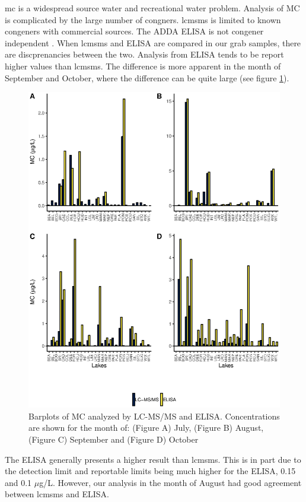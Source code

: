 \gls{mc} is a widespread source water and recreational water problem. Analysis of MC is complicated by the large number of congners. \gls{lcmsms} is limited to known congeners with commercial sources. The ADDA ELISA is not congener independent \cite{he_varied_2017}. When \gls{lcmsms} and ELISA are compared in our grab samples, there are discprenancies between the two. Analysis from ELISA tends to be report higher values than \gls{lcmsms}. The difference is more apparent in the month of September and October, where the difference can be quite large (see figure \ref{fig:compare}). 
\begin{figure}[p]
	\includegraphics[width=\textwidth]{figures/compare}
	\caption{Barplots of MC analyzed by LC-MS/MS and ELISA. Concentrations are shown for the month of: (Figure A) July, (Figure B) August, (Figure C) September and (Figure D) October}
	\label{fig:compare}
\end{figure}
The ELISA generally presents a higher result than \gls{lcmsms}. This is in part due to the detection limit and reportable limits being much higher for the ELISA, 0.15 and 0.1 $\mu$g/L. However, our analysis in the month of August had good agreement between \gls{lcmsms} and ELISA. 

